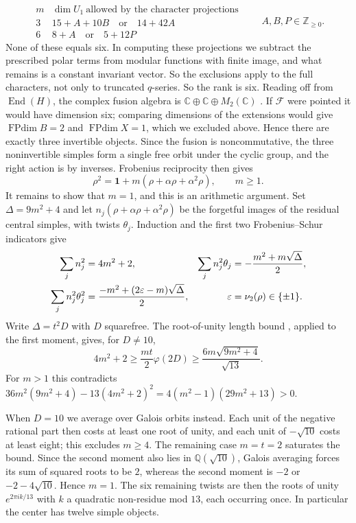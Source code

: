 \documentclass[11pt,a4paper]{article}
\DeclareMathOperator{\End}{End}
\DeclareMathOperator{\FPdim}{FPdim}
\newcommand{\one}{\mathbf1}
\newcommand{\CC}{\mathbb C}
\newcommand{\ZZ}{\mathbb Z}
\newcommand{\QQ}{\mathbb Q}
\begin{document}
\[
 \begin{array}{c|c}
 m&\dim U_1\ \text{allowed by the character projections}\\\hline
 3&15+A+10B\quad\text{or}\quad14+42A\\
 6&8+A\quad\text{or}\quad5+12P
 \end{array}
 \qquad A,B,P\in\ZZ_{\ge0}.
\]
None of these equals six. In computing these projections we subtract
the prescribed polar terms from modular functions with finite image,
and what remains is a constant invariant vector. So the exclusions
apply to the full characters, not only to truncated $q$-series. So the rank is six. Reading off from $\End(H)$, the complex fusion
algebra is $\CC\oplus\CC\oplus M_2(\CC)$ \cite{BJ}. If $\mathcal F$
were pointed it would have dimension six; comparing dimensions of the
extensions would give $\FPdim B=2$ and $\FPdim X=1$, which we excluded
above. Hence there are exactly three invertible objects. Since the
fusion is noncommutative, the three noninvertible simples form a
single free orbit under the cyclic group, and the right action is by
inverses. Frobenius reciprocity then gives
\begin{equation}\label{eq:ringm}
 \rho^2=\one+m(\rho+\alpha\rho+\alpha^2\rho),\qquad m\ge1.
\end{equation}
It remains to show that $m=1$, and this is an arithmetic argument. Set
$\Delta=9m^2+4$ and let $n_j(\rho+\alpha\rho+\alpha^2\rho)$ be the
forgetful images of the residual central simples, with twists $\theta_j$.
Induction and the first two Frobenius--Schur indicators \cite{NS} give
\begin{align}\label{eq:moments}
 \sum_j n_j^2&=4m^2+2,&
 \sum_j n_j^2\theta_j&=-\frac{m^2+m\sqrt\Delta}{2},\notag\\
 \sum_j n_j^2\theta_j^2&=\frac{-m^2+(2\varepsilon-m)\sqrt\Delta}{2},&
 \varepsilon&=\nu_2(\rho)\in\{\pm1\}.
\end{align}
Write $\Delta=t^2D$ with $D$ squarefree. The root-of-unity length
bound \cite{Larson}, applied to the first moment, gives, for $D\ne10$,
\[
 4m^2+2\ge\frac{mt}{2}\varphi(2D)
             \ge\frac{6m\sqrt{9m^2+4}}{\sqrt{13}}.
\]
For $m>1$ this contradicts
$36m^2(9m^2+4)-13(4m^2+2)^2=4(m^2-1)(29m^2+13)>0$.

When $D=10$ we average over Galois orbits instead. Each unit of the
negative rational part then costs at least one root of unity, and each
unit of $-\sqrt{10}$ costs at least eight; this excludes $m\ge4$. The
remaining case $m=t=2$ saturates the bound. Since the second moment
also lies in $\QQ(\sqrt{10})$, Galois averaging forces its sum of
squared roots to be $2$, whereas the second moment is $-2$ or
$-2-4\sqrt{10}$. Hence $m=1$.
The six remaining twists are then the
roots of unity $e^{2\pi ik/13}$ with $k$ a quadratic non-residue
mod $13$, each occurring once.
In particular the center has twelve simple objects.
\end{document}
